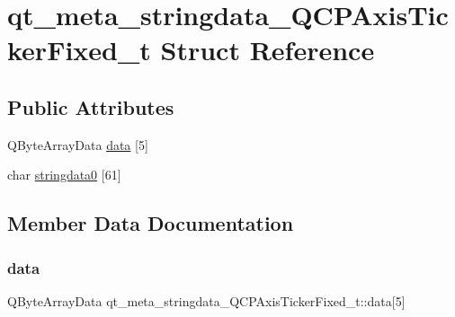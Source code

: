 \hypertarget{structqt__meta__stringdata__QCPAxisTickerFixed__t}{}\section{qt\+\_\+meta\+\_\+stringdata\+\_\+\+Q\+C\+P\+Axis\+Ticker\+Fixed\+\_\+t Struct Reference}
\label{structqt__meta__stringdata__QCPAxisTickerFixed__t}
\subsection*{Public Attributes}
\begin{DoxyCompactItemize}
\item 
Q\+Byte\+Array\+Data \mbox{\hyperlink{structqt__meta__stringdata__QCPAxisTickerFixed__t_a6a154326b81876525a18cc787d72999a}{data}} \mbox{[}5\mbox{]}
\item 
char \mbox{\hyperlink{structqt__meta__stringdata__QCPAxisTickerFixed__t_a4624793f0a8202895228fd43a030e135}{stringdata0}} \mbox{[}61\mbox{]}
\end{DoxyCompactItemize}


\subsection{Member Data Documentation}
\mbox{\label{structqt__meta__stringdata__QCPAxisTickerFixed__t_a6a154326b81876525a18cc787d72999a}} 
\subsubsection{\texorpdfstring{data}{data}}
{\footnotesize\ttfamily Q\+Byte\+Array\+Data qt\+\_\+meta\+\_\+stringdata\+\_\+\+Q\+C\+P\+Axis\+Ticker\+Fixed\+\_\+t\+::data\mbox{[}5\mbox{]}}

\mbox{\label{structqt__meta__stringdata__QCPAxisTickerFixed__t_a4624793f0a8202895228fd43a030e135}} 
